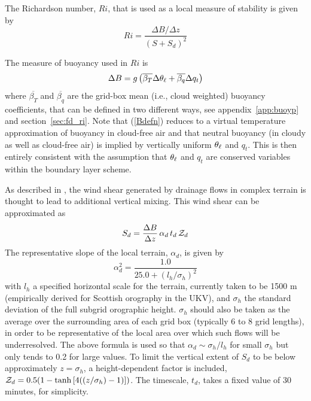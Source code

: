 \documentclass{UMDP_article}
\begin{document}
The Richardson number, $Ri$, that is used as a local measure of
stability is given by
\begin{equation}
  Ri = \frac{\Delta B / \Delta z}{(S+S_d)^2}
  \label{ridefn}
\end{equation}

The measure of buoyancy used in $Ri$ is 
\begin{equation}
  \Delta B = g\left(   \overline{\beta_T} \Delta \theta_{\ell}
           + \overline{\beta_q} \Delta q_t    \right)
  \label{Bdefn}
\end{equation}
where $\overline{\beta_T}$ and $\overline{\beta_q}$ are the grid-box
mean (\mbox{i.e.}, cloud weighted) buoyancy coefficients, that can be 
defined in two different ways, see appendix~\ref{app:buoyp} and 
section~\ref{sec:fd_ri}.  Note that (\ref{Bdefn}) reduces
to a virtual temperature approximation of buoyancy in cloud-free air
and that neutral buoyancy (in cloudy as well as cloud-free air) is
implied by vertically uniform $\theta_{\ell}$ and $q_t$.  This is then
entirely consistent with the assumption that $\theta_{\ell}$ and $q_t$ are
conserved variables within the boundary layer scheme.

As described in \cite{lock2012}, the wind shear generated by drainage
flows in complex terrain is thought to lead to additional vertical
mixing.  This wind shear can be approximated as
\begin{equation*}
  S_d = \frac{\Delta B }{ \Delta z} \, \alpha_d \, t_d \, {\cal Z}_d
\end{equation*}
The representative slope of the local terrain, $\alpha_d$, is given by
\begin{equation*}
  \alpha_d^2 = \frac{1.0}{ 25.0 + (l_h/\sigma_h)^2}
\end{equation*}
with $l_h$ a specified horizontal scale for the terrain, currently
taken to be 1500 m (empirically derived for Scottish orography in the
UKV), and $\sigma_h$ the standard deviation of the full subgrid
orographic height.  $\sigma_h$ should also be taken as the average
over the surrounding area of each grid box (typically 6 to 8 grid
lengths), in order to be representative of the local area over which
such flows will be underresolved.  The above formula is used so that
$\alpha_d \sim \sigma_h/l_h $ for small $\sigma_h$ but only tends to
0.2 for large values.  To limit the vertical extent of $S_d$ to be
below approximately $z=\sigma_h$, a height-dependent factor is
included, ${\cal Z}_d = 0.5( 1 - {\rm tanh}\left[ 4 ((z/\sigma_h)-1)
\right])$.  The timescale, $t_d$, takes a fixed value of 30 minutes,
for simplicity.
\end{document}
